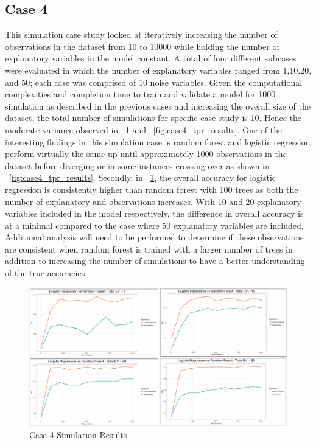 \documentclass{llncs}
\begin{document}
\subsection{Case 4}

This simulation case study looked at iteratively increasing the number of observations in the dataset from 10 to 10000 while holding the number of explanatory variables in the model constant. A total of four different subcases were evaluated in which the number of explanatory variables ranged from 1,10,20, and 50; each case was comprised of 10 noise variables. Given the computational complexities and completion time to train and validate a model for 1000 simulation as described in the previous cases and increasing the overall size of the dataset, the total number of simulations for specific case study is 10. Hence the moderate variance observed in ~\ref{fig:case4_acc_results} and ~\ref{fig:case4_tpr_results}. One of the interesting findings in this simulation case is random forest and logistic regression perform virtually the same up until approximately 1000 observations in the dataset before diverging or in some instances crossing over as shown in ~\ref{fig:case4_tpr_results}. Secondly, in ~\ref{fig:case4_acc_results}, the overall accuracy for logistic regression is consistently higher than random forest with 100 trees as both the number of explanatory and observations increases. With 10 and 20 explanatory variables included in the model respectively, the difference in overall accuracy is at a minimal compared to the case where 50 explanatory variables are included. Additional analysis will need to be performed to determine if these observations are consistent when random forest is trained with a larger number of trees in addition to increasing the number of simulations to have a better understanding of the true accuracies.

\begin{figure}
\centering
\includegraphics[scale=0.55]{case4_acc.png}
\caption{Case 4 Simulation Results}
\label{fig:case4_acc_results}
\end{figure}
\end{document}
